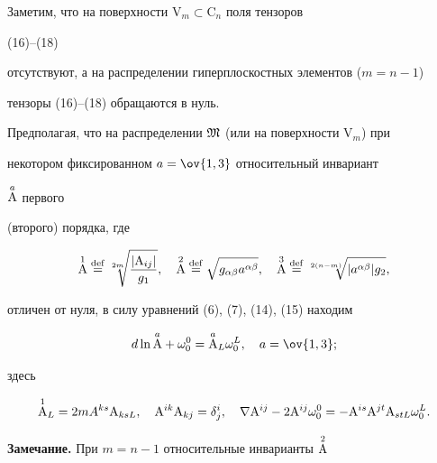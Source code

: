 Заметим, что на поверхности $\mathrm V_m\subset\mathrm C_n$ поля тензоров 


(16)--(18) 


отсутствуют, а на распределении гиперплоскостных элементов ($m=n-1$) 


тензоры (16)--(18) обращаются в нуль. 


 


Предполагая, что на распределении $\frak M$ (или на поверхности $\mathrm 


V_m$) при 


некотором фиксированном $a=\ov{1,3}$ относительный инвариант 


$\overset{a}{\mathrm A}{}$ первого 


(второго) порядка, где 


\begin{equation} 


\up{1}{\mathrm A}\eqdef\sqrt[2m]{\frac{|\mathrm A_{i j}|}{g_1}},\quad 


\up{2}{\mathrm A}\eqdef\sqrt{g_{\alpha\beta}a^{\alpha\beta}},\quad 


\up{3}{\mathrm A}\eqdef\sqrt[2(n-m)]{|a^{\alpha\beta}|g_2}, 


\end{equation} 


отличен от нуля, в силу уравнений (6), (7), (14), (15) находим 


\begin{equation} 


d\ln\up{a}{\mathrm A}+\omega^0_0=\up{a}{\mathrm A}_L 


\omega^L_0,\quad a=\ov{1,3}; 


\end{equation} 


здесь 


\begin{equation} 


\up{1}{\mathrm A}_L=2m A^{k s}\mathrm A_{k s L},\quad 


\mathrm A^{i k}\mathrm A_{k j}=\delta^i_j,\quad 


\nabla\mathrm A^{i j}-2\mathrm A^{i j}\omega^0_0= 


-\mathrm A^{is}\mathrm A^{j t}\mathrm A_{s t L}\omega^L_0. 


\end{equation} 


 


{\bf Замечание.} При $m=n-1$ относительные инварианты $\overset{2}{\mathrm A}{}$ 


